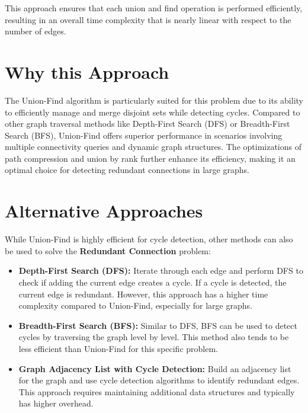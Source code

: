 This approach ensures that each union and find operation is performed efficiently, resulting in an overall time complexity that is nearly linear with respect to the number of edges.

\section*{Why this Approach}

The Union-Find algorithm is particularly suited for this problem due to its ability to efficiently manage and merge disjoint sets while detecting cycles. Compared to other graph traversal methods like Depth-First Search (DFS) or Breadth-First Search (BFS), Union-Find offers superior performance in scenarios involving multiple connectivity queries and dynamic graph structures. The optimizations of path compression and union by rank further enhance its efficiency, making it an optimal choice for detecting redundant connections in large graphs.

\section*{Alternative Approaches}

While Union-Find is highly efficient for cycle detection, other methods can also be used to solve the \textbf{Redundant Connection} problem:

\begin{itemize}
    \item \textbf{Depth-First Search (DFS):}  
    Iterate through each edge and perform DFS to check if adding the current edge creates a cycle. If a cycle is detected, the current edge is redundant. However, this approach has a higher time complexity compared to Union-Find, especially for large graphs.
    
    \item \textbf{Breadth-First Search (BFS):}  
    Similar to DFS, BFS can be used to detect cycles by traversing the graph level by level. This method also tends to be less efficient than Union-Find for this specific problem.
    
    \item \textbf{Graph Adjacency List with Cycle Detection:} 
    Build an adjacency list for the graph and use cycle detection algorithms to identify redundant edges. This approach requires maintaining additional data structures and typically has higher overhead.
\end{itemize}

